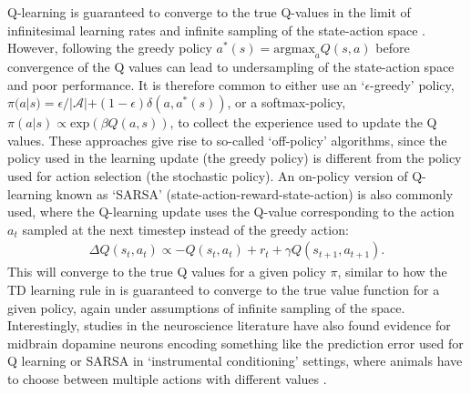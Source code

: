 

Q-learning is guaranteed to converge to the true Q-values in the limit of infinitesimal learning rates and infinite sampling of the state-action space \citep{watkins1992q,sutton2018reinforcement}.
However, following the greedy policy $a^*(s) = \text{argmax}_{a} Q(s, a)$ before convergence of the Q values can lead to undersampling of the state-action space and poor performance.
It is therefore common to either use an `$\epsilon$-greedy' policy, $\pi(a|s) = \epsilon / |\mathcal{A}| + (1-\epsilon) \delta(a, a^*(s))$, or a softmax-policy, $\pi(a|s) \propto \text{exp}(\beta Q(a, s))$, to collect the experience used to update the Q values.
These approaches give rise to so-called `off-policy' algorithms, since the policy used in the learning update (the greedy policy) is different from the policy used for action selection (the stochastic policy).
An on-policy version of Q-learning known as `SARSA' (state-action-reward-state-action) is also commonly used, where the Q-learning update uses the Q-value corresponding to the action $a_t$ sampled at the next timestep instead of the greedy action:
\begin{align}
    \Delta  Q(s_t,a_t) \propto - Q(s_t,a_t) + r_t + \gamma Q(s_{t+1}, a_{t+1}).
\end{align}
This will converge to the true Q values for a given policy $\pi$, similar to how the TD learning rule in  is guaranteed to converge to the true value function for a given policy, again under assumptions of infinite sampling of the space.
Interestingly, studies in the neuroscience literature have also found evidence for midbrain dopamine neurons encoding something like the prediction error used for Q learning \citep{roesch2007dopamine} or SARSA \citep{morris2006midbrain} in `instrumental conditioning' settings, where animals have to choose between multiple actions with different values \citep{niv2009reinforcement}.

